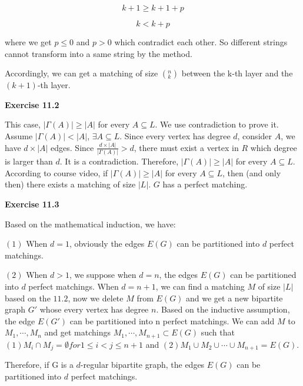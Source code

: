 \documentclass{article} %
\begin{document}
	 $$
	 k+1 \ge k+1+p
	 $$

	 $$
	 k<k+p
	 $$

	 where we get $p\leq 0$ and $p>0$ which contradict each other. So  different strings cannot transform into a same string by the method.\par
	
	 Accordingly, we can get a matching of size $(^n _k)$ between the k-th layer and the $(k+1)$-th layer.\par

\textbf{Exercise 11.2}\par
	This case, $|\Gamma(A)|\ge |A|$ for every $A\subseteq L$. We use contradiction to prove it.
	Assume $|\Gamma(A)|<|A|$, $\exists A\subseteq L$. Since every vertex has degree $d$, consider $A$, we have $d\times |A|$ edges.
	Since $\frac{d\times|A|}{|\Gamma(A)|}>d$, there must exist a vertex in $R$ which degree is larger than $d$. It is a contradiction.
	Therefore, $|\Gamma(A)|\ge |A|$ for every $A\subseteq L$. According to course video, if $|\Gamma(A)|\ge |A|$ for every $A\subseteq L$,
	then (and only then) there exists a matching of size $|L|$. $G$ has a perfect matching.\par 	


\textbf{Exercise 11.3}\par
    Based on the mathematical induction, we have:\par
    $(1)$ When $d=1$, obviously the edges $E(G)$ can be partitioned into $d$ perfect matchings.\par
    $(2)$ When $d>1$, we suppose when $d=n$, the edges $E(G)$ can be partitioned into $d$ perfect matchings. When $d=n+1$, we can find a matching $M$ of size $|L|$ based on the $11.2$, now we delete $M$ from $E(G)$ and we get a new bipartite graph $G\prime$ whose every vertex has degree $n$. Based on the inductive assumption, the edge $E(G\prime)$ can be partitioned into n perfect matchings. We can add $M$ to $M_1,\cdots,M_n$ and get matchings $M_1,\cdots,M_{n+1} \subset E(G)$ such that $(1) M_i \cap M_j = \emptyset for 1\leq i<j\leq n+1$ and $(2) M_1\cup M_2 \cup\cdots\cup M_{n+1} = E(G)$.\par
    Therefore, if G is a $d$-regular bipartite graph, the edges $E(G)$ can be partitioned into $d$ perfect matchings.\par
\end{document}
